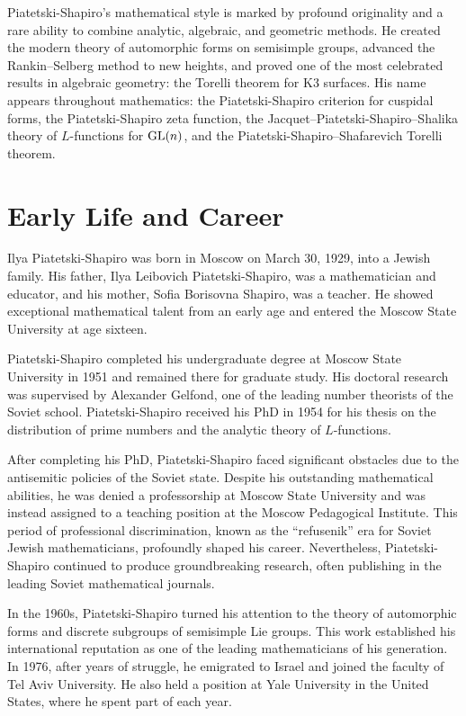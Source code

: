 Piatetski-Shapiro's mathematical style is marked by profound originality and a rare ability to combine analytic, algebraic, and geometric methods. He created the modern theory of automorphic forms on semisimple groups, advanced the Rankin--Selberg method to new heights, and proved one of the most celebrated results in algebraic geometry: the Torelli theorem for K3 surfaces. His name appears throughout mathematics: the Piatetski-Shapiro criterion for cuspidal forms, the Piatetski-Shapiro zeta function, the Jacquet--Piatetski-Shapiro--Shalika theory of \(L\)-functions for \(\operatorname{GL}(n)\), and the Piatetski-Shapiro--Shafarevich Torelli theorem.

\section{Early Life and Career}

Ilya Piatetski-Shapiro was born in Moscow on March 30, 1929, into a Jewish family. His father, Ilya Leibovich Piatetski-Shapiro, was a mathematician and educator, and his mother, Sofia Borisovna Shapiro, was a teacher. He showed exceptional mathematical talent from an early age and entered the Moscow State University at age sixteen.

Piatetski-Shapiro completed his undergraduate degree at Moscow State University in 1951 and remained there for graduate study. His doctoral research was supervised by Alexander Gelfond, one of the leading number theorists of the Soviet school. Piatetski-Shapiro received his PhD in 1954 for his thesis on the distribution of prime numbers and the analytic theory of \(L\)-functions.

After completing his PhD, Piatetski-Shapiro faced significant obstacles due to the antisemitic policies of the Soviet state. Despite his outstanding mathematical abilities, he was denied a professorship at Moscow State University and was instead assigned to a teaching position at the Moscow Pedagogical Institute. This period of professional discrimination, known as the ``refusenik'' era for Soviet Jewish mathematicians, profoundly shaped his career. Nevertheless, Piatetski-Shapiro continued to produce groundbreaking research, often publishing in the leading Soviet mathematical journals.

In the 1960s, Piatetski-Shapiro turned his attention to the theory of automorphic forms and discrete subgroups of semisimple Lie groups. This work established his international reputation as one of the leading mathematicians of his generation. In 1976, after years of struggle, he emigrated to Israel and joined the faculty of Tel Aviv University. He also held a position at Yale University in the United States, where he spent part of each year.

